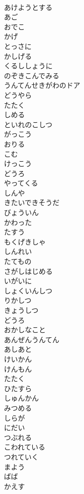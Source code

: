 \documentclass[8pt]{extreport}
\begin{document}
\begin{CJK}{UTF8}{min}
\\	あけようとする
\\	あご
\\	おでこ
\\	かげ
\\	とっさに
\\	かしげる
\\	くるししょうに
\\	のぞきこんでみる
\\	うんてんせきがわのドア
\\	どうやら
\\	たたく
\\	しめる
\\	といれのこしつ
\\	がっこう
\\	おりる
\\	こむ
\\	けっこう
\\	どうろ
\\	やってくる
\\	しんや
\\	きたいできそうだ
\\	びょういん
\\	かわった
\\	たすう
\\	もくげきしゃ
\\	しんれい
\\	たてもの
\\	さがしはじめる
\\	いがいに
\\	しょくいんしつ
\\	りかしつ
\\	きょうしつ
\\	どうろ
\\	おかしなこと
\\	あんぜんうんてん
\\	あしあと
\\	けいかん
\\	けんもん
\\	たたく
\\	ひたすら
\\	しゅんかん
\\	みつめる
\\	しらが
\\	にだい
\\	つぶれる
\\	こわれている
\\	つれていく
\\	まよう
\\	ばば
\\	かえす

\end{CJK}
\end{document}

